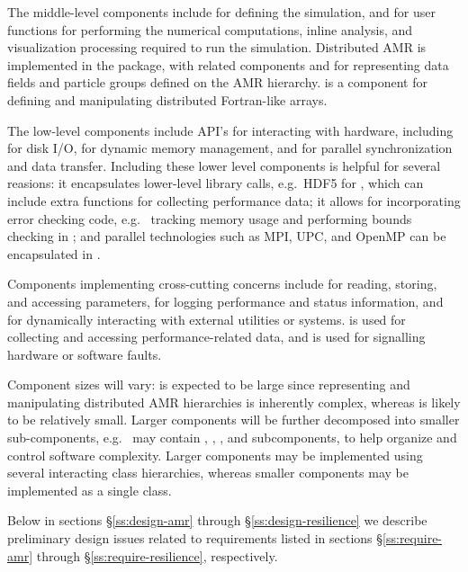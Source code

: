 \documentclass[10pt]{article}
\begin{document}
The middle-level components include  for defining the
simulation, and  for user functions for
performing the numerical computations, inline analysis, and
visualization processing required to run the simulation.  Distributed
AMR is implemented in the  package, with related components
 and  for representing data fields and
particle groups defined on the AMR hierarchy.   is a
component for defining and manipulating distributed Fortran-like
arrays.

The low-level components include API's for interacting with hardware,
including  for disk I/O,  for dynamic memory
management, and  for parallel synchronization and data
transfer.  Including these lower level components is helpful for
several reasions: it encapsulates lower-level library calls, e.g.~HDF5
for , which can include extra functions for collecting
performance data; it allows for incorporating error checking code,
e.g.~ tracking memory usage and performing bounds checking in
; and parallel technologies such as MPI, UPC, and OpenMP
can be encapsulated in .

Components implementing cross-cutting concerns include
 for reading, storing, and accessing parameters,
 for logging performance and status information, and
 for dynamically interacting with external utilities or
systems.   is used for collecting and accessing
performance-related data, and  is used for signalling
hardware or software faults.

Component sizes will vary:  is expected to be large since
representing and manipulating distributed AMR hierarchies is
inherently complex, whereas  is likely to be relatively
small.  Larger components will be further decomposed into smaller
sub-components, e.g.~ may contain , ,
, and  subcomponents, to help organize and
control software complexity.  Larger components may be implemented
using several interacting class hierarchies, whereas smaller
components may be implemented as a single class.

Below in sections \S\ref{ss:design-amr} through
\S\ref{ss:design-resilience} we describe preliminary design issues
related to requirements listed in sections \S\ref{ss:require-amr}
through \S\ref{ss:require-resilience}, respectively.
\end{document}

